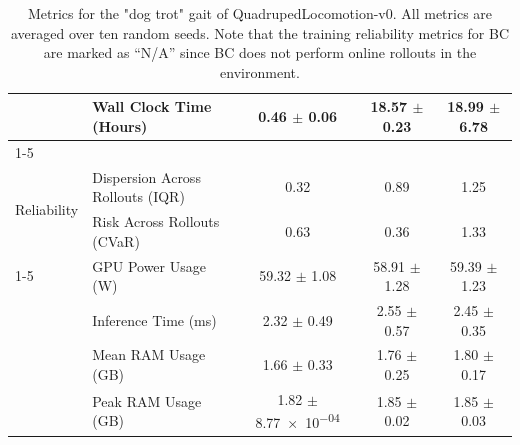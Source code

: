 \begin{table}[!htbp]
{\begin{tabular}{|l|l|c|c|c|}
 & Wall Clock Time (Hours) & 0.46 $\pm$ 0.06 & 18.57 $\pm$ 0.23 & 18.99 $\pm$ 6.78 \\
\cline{1-5}
\midrule
\multicolumn{5}{|c|}{\textbf{Dog Trot (Inference)}} \\
\multirow[t]{2}{*}{Reliability} & Dispersion Across Rollouts (IQR) & 0.32 & 0.89 & 1.25 \\
 & Risk Across Rollouts (CVaR) & 0.63 & 0.36 & 1.33 \\
\cline{1-5}
\multirow[t]{4}{*}{System} & GPU Power Usage (W) & 59.32 $\pm$ 1.08 & 58.91 $\pm$ 1.28 & 59.39 $\pm$ 1.23 \\

 & Inference Time (ms) & 2.32 $\pm$ 0.49 & 2.55 $\pm$ 0.57 & 2.45 $\pm$ 0.35 \\

 & Mean RAM Usage (GB) & 1.66 $\pm$ 0.33 & 1.76 $\pm$ 0.25 & 1.80 $\pm$ 0.17 \\
 & Peak RAM Usage (GB) & 1.82 $\pm$ \num{8.77e-04} & 1.85 $\pm$ 0.02 & 1.85 $\pm$ 0.03 \\
\bottomrule
\end{tabular}
}
\caption{Metrics for the "dog trot" gait of QuadrupedLocomotion-v0. All metrics are averaged over ten random seeds. Note that the training reliability metrics for BC are marked as ``N/A'' since BC does not perform online rollouts in the environment.}
\label{tab:appendix_locomotion_dog_trot}
\end{table}


